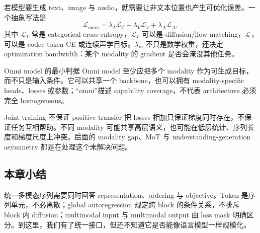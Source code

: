 若模型要生成 text、image 与 audio，就需要让非文本位置也产生可优化误差。一个抽象写法是
$$
\mathcal{L}_{\text{omni}}
=\lambda_T\mathcal{L}_{T}
+\lambda_V\mathcal{L}_{V}
+\lambda_A\mathcal{L}_{A},
$$
其中 $\mathcal{L}_{T}$ 常是 categorical cross-entropy，$\mathcal{L}_{V}$ 可以是 diffusion/flow matching，$\mathcal{L}_{A}$ 可以是 codec-token CE 或连续声学目标。$\lambda_m$ 不只是数学权重，还决定 optimization bandwidth：某个 modality 的 gradient 是否会淹没其他任务。


\begin{importantbox}{Omni model 的最小判据}
Omni model 至少应把多个 modality 作为可生成目标，而不只是输入条件。它可以共享一个 backbone，也可以拥有 modality-specific heads、losses 或参数；“omni”描述 capability coverage，不代表 architecture 必须完全 homogeneous。
\end{importantbox}

\begin{warningbox}{Joint training 不保证 positive transfer}
把 losses 相加只保证梯度同时存在，不保证任务互相帮助。不同 modality 可能共享高层语义，也可能在低层统计、序列长度和梯度尺度上冲突。后面的 modality gap、MoT 与 understanding-generation asymmetry 都是在处理这个未解决问题。
\end{warningbox}

\subsection{本章小结}

统一多模态序列需要同时回答 representation、ordering 与 objective。Token 是序列单元，不必离散；global autoregression 规定跨 block 的条件关系，不排斥 block 内 diffusion；multimodal input 与 multimodal output 由 loss mask 明确区分。到这里，我们有了统一接口，但还不知道它是否能像语言模型一样规模化。

